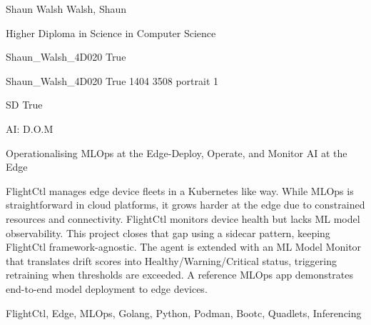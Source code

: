 
\begingroup{}\relax



\def\Key{Shaun_Walsh_4D020}

{Shaun Walsh}
{Walsh, Shaun}

{Higher Diploma in Science in Computer Science}

{Shaun_Walsh_4D020}
{True}

{Shaun_Walsh_4D020}
{True}
{1404}
{3508}
{portrait}
{1}

{SD}
{True}

{AI: D.O.M}

{Operationalising MLOps at the Edge-Deploy, Operate, and Monitor AI at the Edge}

{FlightCtl manages edge device fleets in a Kubernetes like way. While MLOps is straightforward in cloud platforms, it grows harder at the edge due to constrained resources and connectivity. FlightCtl monitors device health but lacks ML model observability. This project closes that gap using a sidecar pattern, keeping FlightCtl framework-agnostic. The agent is extended with an ML Model Monitor that translates drift scores into Healthy/Warning/Critical status, triggering retraining when thresholds are exceeded. A reference MLOps app demonstrates end-to-end model deployment to edge devices.}

{FlightCtl, Edge, MLOps, Golang, Python, Podman, Bootc, Quadlets, Inferencing}

